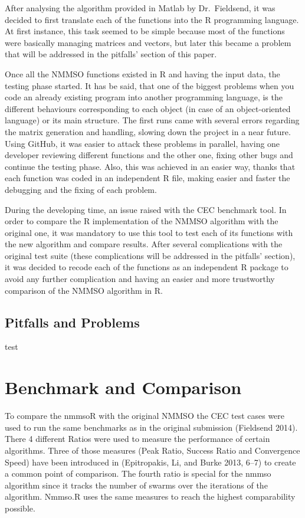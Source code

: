 \documentclass[12pt,a4paper]{article}
\begin{document}
After analysing the algorithm provided in Matlab by Dr.~Fieldsend, it
was decided to first translate each of the functions into the R
programming language. At first instance, this task seemed to be simple
because most of the functions were basically managing matrices and
vectors, but later this became a problem that will be addressed in the
pitfalls' section of this paper.

Once all the NMMSO functions existed in R and having the input data, the
testing phase started. It has be said, that one of the biggest problems
when you code an already existing program into another programming
language, is the different behaviours corresponding to each object (in
case of an object-oriented language) or its main structure. The first
runs came with several errors regarding the matrix generation and
handling, slowing down the project in a near future. Using GitHub, it
was easier to attack these problems in parallel, having one developer
reviewing different functions and the other one, fixing other bugs and
continue the testing phase. Also, this was achieved in an easier way,
thanks that each function was coded in an independent R file, making
easier and faster the debugging and the fixing of each problem.

During the developing time, an issue raised with the CEC benchmark tool.
In order to compare the R implementation of the NMMSO algorithm with the
original one, it was mandatory to use this tool to test each of its
functions with the new algorithm and compare results. After several
complications with the original test suite (these complications will be
addressed in the pitfalls' section), it was decided to recode each of
the functions as an independent R package to avoid any further
complication and having an easier and more trustworthy comparison of the
NMMSO algorithm in R.

\subsection{Pitfalls and Problems}\label{pitfalls-and-problems}

test

\section{Benchmark and Comparison}\label{benchmark-and-comparison}

To compare the nmmsoR with the original NMMSO the CEC test cases were
used to run the same benchmarks as in the original submission (Fieldsend
2014). There 4 different Ratios were used to measure the performance of
certain algorithms. Three of those measures (Peak Ratio, Success Ratio
and Convergence Speed) have been introduced in (Epitropakis, Li, and
Burke 2013, 6--7) to create a common point of comparison. The fourth
ratio is special for the nmmso algorithm since it tracks the number of
swarms over the iterations of the algorithm. Nmmso.R uses the same
measures to reach the highest comparability possible.
\end{document}

